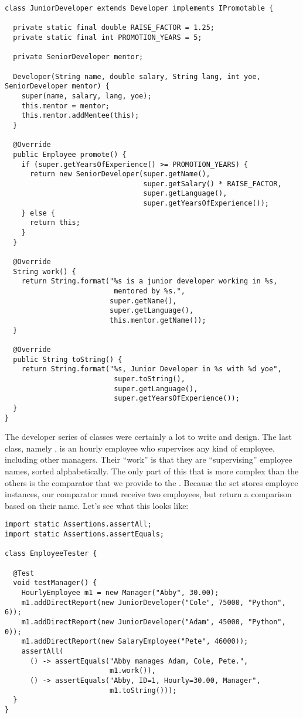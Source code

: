 \enlargethispage{-8\baselineskip}
\begin{lstlisting}[language=MyJava]
class JuniorDeveloper extends Developer implements IPromotable {

  private static final double RAISE_FACTOR = 1.25;
  private static final int PROMOTION_YEARS = 5;

  private SeniorDeveloper mentor;

  Developer(String name, double salary, String lang, int yoe, SeniorDeveloper mentor) {
    super(name, salary, lang, yoe);
    this.mentor = mentor;
    this.mentor.addMentee(this);
  }

  @Override
  public Employee promote() {
    if (super.getYearsOfExperience() >= PROMOTION_YEARS) {
      return new SeniorDeveloper(super.getName(), 
                                 super.getSalary() * RAISE_FACTOR, 
                                 super.getLanguage(), 
                                 super.getYearsOfExperience());
    } else {
      return this;
    }
  }

  @Override
  String work() {
    return String.format("%s is a junior developer working in %s, 
                          mentored by %s.", 
                         super.getName(),
                         super.getLanguage(),
                         this.mentor.getName());
  }

  @Override
  public String toString() {
    return String.format("%s, Junior Developer in %s with %d yoe", 
                          super.toString(),
                          super.getLanguage(),
                          super.getYearsOfExperience());
  }
}
\end{lstlisting}

The developer series of classes were certainly a lot to write and design. The last class, namely , is an hourly employee who supervises any kind of employee, including other managers. Their ``work'' is that they are ``supervising'' employee names, sorted alphabetically. The only part of this that is more complex than the others is the comparator that we provide to the . Because the set stores employee instances, our comparator must receive two employees, but return a comparison based on their name. Let's see what this looks like:

\enlargethispage{-7\baselineskip}
\begin{lstlisting}[language=MyJava]
import static Assertions.assertAll;
import static Assertions.assertEquals;

class EmployeeTester {

  @Test
  void testManager() {
    HourlyEmployee m1 = new Manager("Abby", 30.00);
    m1.addDirectReport(new JuniorDeveloper("Cole", 75000, "Python", 6));
    m1.addDirectReport(new JuniorDeveloper("Adam", 45000, "Python", 0));
    m1.addDirectReport(new SalaryEmployee("Pete", 46000));
    assertAll(
      () -> assertEquals("Abby manages Adam, Cole, Pete.", 
                         m1.work()),
      () -> assertEquals("Abby, ID=1, Hourly=30.00, Manager", 
                         m1.toString()));
  }
}
\end{lstlisting}

